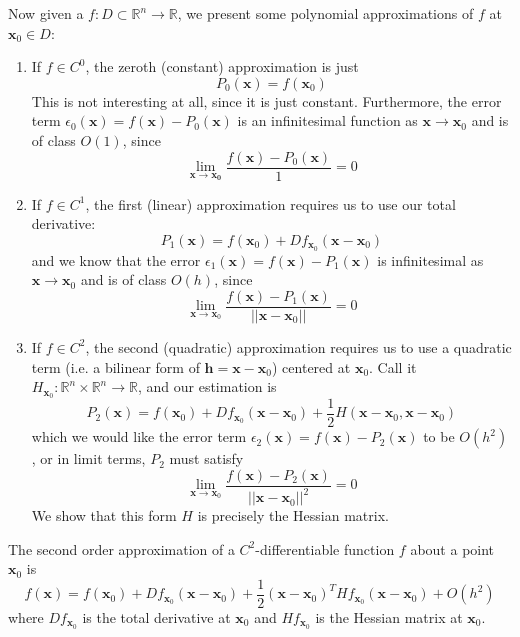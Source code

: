   Now given a $f: D \subset \mathbb{R}^n \longrightarrow \mathbb{R}$, we present some polynomial approximations of $f$ at $\mathbf{x}_0 \in D$: 
  \begin{enumerate}
    \item If $f \in C^0$, the zeroth (constant) approximation is just 
    \[P_0 (\mathbf{x}) = f(\mathbf{x}_0)\]
    This is not interesting at all, since it is just constant. Furthermore, the error term $\epsilon_0 (\mathbf{x}) = f(\mathbf{x}) - P_0 (\mathbf{x})$ is an infinitesimal function as $\mathbf{x} \rightarrow \mathbf{x}_0$ and is of class $O(1)$, since 
    \[\lim_{\mathbf{x} \rightarrow \mathbf{x_0}} \frac{f(\mathbf{x}) - P_0 (\mathbf{x})}{1} = 0\]
    
    \item If $f \in C^1$, the first (linear) approximation requires us to use our total derivative: 
    \[P_1 (\mathbf{x}) = f(\mathbf{x}_0) + D f_{\mathbf{x}_0} (\mathbf{x} - \mathbf{x}_0)\]
    and we know that the error $\epsilon_1 (\mathbf{x}) = f(\mathbf{x}) - P_1 (\mathbf{x})$ is infinitesimal as $\mathbf{x} \rightarrow \mathbf{x}_0$ and is of class $O(h)$, since 
    \[\lim_{\mathbf{x} \rightarrow \mathbf{x}_0} \frac{f(\mathbf{x}) - P_1(\mathbf{x})}{||\mathbf{x} - \mathbf{x}_0||} = 0\]
    
    \item If $f \in C^2$, the second (quadratic) approximation requires us to use a quadratic term (i.e. a bilinear form of $\mathbf{h} = \mathbf{x} - \mathbf{x}_0$) centered at $\mathbf{x}_0$. Call it $H_{\mathbf{x}_0}: \mathbb{R}^n \times \mathbb{R}^n \longrightarrow \mathbb{R}$, and our estimation is 
    \[P_2 (\mathbf{x}) = f(\mathbf{x}_0) + D f_{\mathbf{x}_0} (\mathbf{x} - \mathbf{x}_0) + \frac{1}{2} H (\mathbf{x} - \mathbf{x}_0, \mathbf{x} - \mathbf{x}_0)\]
    which we would like the error term $\epsilon_2 (\mathbf{x}) = f(\mathbf{x}) - P_2 (\mathbf{x})$ to be $O(h^2)$, or in limit terms, $P_2$ must satisfy 
    \[\lim_{\mathbf{x} \rightarrow \mathbf{x}_0} \frac{f(\mathbf{x}) - P_2 (\mathbf{x})}{||\mathbf{x} - \mathbf{x}_0||^2} = 0\]
    We show that this form $H$ is precisely the Hessian matrix. 
  \end{enumerate}

  \begin{theorem}[Hessian]
  The second order approximation of a $C^2$-differentiable function $f$ about a point $\mathbf{x}_0$ is 
  \[f (\mathbf{x}) = f(\mathbf{x}_0) + D f_{\mathbf{x}_0} (\mathbf{x} - \mathbf{x}_0) + \frac{1}{2} (\mathbf{x} - \mathbf{x}_0)^T H f_{\mathbf{x}_0} (\mathbf{x} - \mathbf{x}_0) + O(h^2)\]
  where $D f_{\mathbf{x}_0}$ is the total derivative at $\mathbf{x}_0$ and $H f_{\mathbf{x}_0}$ is the Hessian matrix at $\mathbf{x}_0$. 
  \end{theorem}

